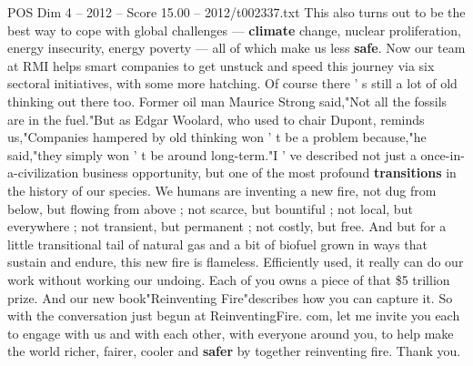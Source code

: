 \begin{textsample}{POS Dim 4 – 2012 – Score 15.00 – 2012/t002337.txt}
This also turns out to be the best way to cope with global challenges — \textbf{climate} change, nuclear proliferation, energy insecurity, energy poverty — all of which make us less \textbf{safe}.
Now our team at RMI helps smart companies to get unstuck and speed this journey via six sectoral initiatives, with some more hatching.
Of course there ' s still a lot of old thinking out there too.
Former oil man Maurice Strong said,"Not all the fossils are in the fuel."But as Edgar Woolard, who used to chair Dupont, reminds us,"Companies hampered by old thinking won ' t be a problem because,"he said,"they simply won ' t be around long-term."I ' ve described not just a once-in-a-civilization business opportunity, but one of the most profound \textbf{transitions} in the history of our species.
We humans are inventing a new fire, not dug from below, but flowing from above ; not scarce, but bountiful ; not local, but everywhere ; not transient, but permanent ; not costly, but free.
And but for a little transitional tail of natural gas and a bit of biofuel grown in ways that sustain and endure, this new fire is flameless.
Efficiently used, it really can do our work without working our undoing.
Each of you owns a piece of that \$5 trillion prize.
And our new book"Reinventing Fire"describes how you can capture it.
So with the conversation just begun at ReinventingFire. com, let me invite you each to engage with us and with each other, with everyone around you, to help make the world richer, fairer, cooler and \textbf{safer} by together reinventing fire.
Thank you.

\end{textsample}
